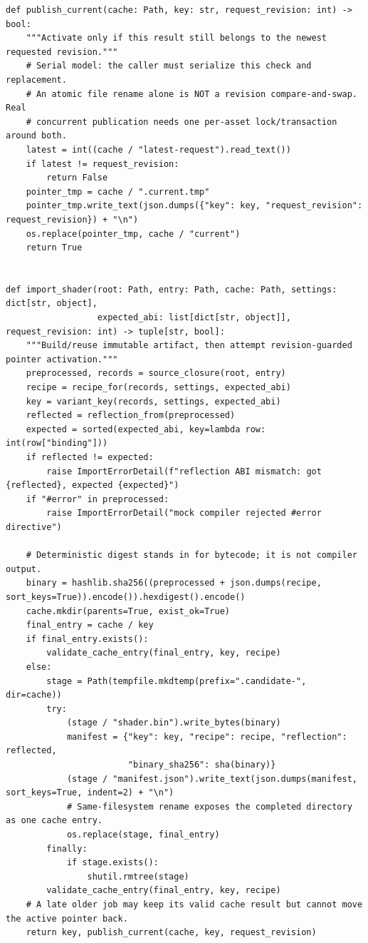 \begin{verbatim}
def publish_current(cache: Path, key: str, request_revision: int) -> bool:
    """Activate only if this result still belongs to the newest requested revision."""
    # Serial model: the caller must serialize this check and replacement.
    # An atomic file rename alone is NOT a revision compare-and-swap. Real
    # concurrent publication needs one per-asset lock/transaction around both.
    latest = int((cache / "latest-request").read_text())
    if latest != request_revision:
        return False
    pointer_tmp = cache / ".current.tmp"
    pointer_tmp.write_text(json.dumps({"key": key, "request_revision": request_revision}) + "\n")
    os.replace(pointer_tmp, cache / "current")
    return True


def import_shader(root: Path, entry: Path, cache: Path, settings: dict[str, object],
                  expected_abi: list[dict[str, object]], request_revision: int) -> tuple[str, bool]:
    """Build/reuse immutable artifact, then attempt revision-guarded pointer activation."""
    preprocessed, records = source_closure(root, entry)
    recipe = recipe_for(records, settings, expected_abi)
    key = variant_key(records, settings, expected_abi)
    reflected = reflection_from(preprocessed)
    expected = sorted(expected_abi, key=lambda row: int(row["binding"]))
    if reflected != expected:
        raise ImportErrorDetail(f"reflection ABI mismatch: got {reflected}, expected {expected}")
    if "#error" in preprocessed:
        raise ImportErrorDetail("mock compiler rejected #error directive")

    # Deterministic digest stands in for bytecode; it is not compiler output.
    binary = hashlib.sha256((preprocessed + json.dumps(recipe, sort_keys=True)).encode()).hexdigest().encode()
    cache.mkdir(parents=True, exist_ok=True)
    final_entry = cache / key
    if final_entry.exists():
        validate_cache_entry(final_entry, key, recipe)
    else:
        stage = Path(tempfile.mkdtemp(prefix=".candidate-", dir=cache))
        try:
            (stage / "shader.bin").write_bytes(binary)
            manifest = {"key": key, "recipe": recipe, "reflection": reflected,
                        "binary_sha256": sha(binary)}
            (stage / "manifest.json").write_text(json.dumps(manifest, sort_keys=True, indent=2) + "\n")
            # Same-filesystem rename exposes the completed directory as one cache entry.
            os.replace(stage, final_entry)
        finally:
            if stage.exists():
                shutil.rmtree(stage)
        validate_cache_entry(final_entry, key, recipe)
    # A late older job may keep its valid cache result but cannot move the active pointer back.
    return key, publish_current(cache, key, request_revision)



\end{verbatim}
